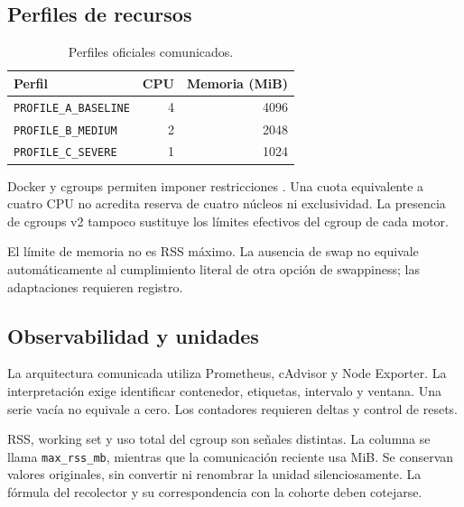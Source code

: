 \subsection{Perfiles de recursos}
\begin{table}[!htbp]\centering
\caption{Perfiles oficiales comunicados.}\label{tab:perfiles}
\begin{tabular}{lrr}\toprule
Perfil & CPU & Memoria (MiB)\\\midrule
\texttt{PROFILE\_A\_BASELINE} & 4 & 4096\\
\texttt{PROFILE\_B\_MEDIUM} & 2 & 2048\\
\texttt{PROFILE\_C\_SEVERE} & 1 & 1024\\
\bottomrule\end{tabular}
\end{table}
Docker y cgroups permiten imponer restricciones \cite{docker,kernel}.
Una cuota equivalente a cuatro CPU no acredita reserva de cuatro
núcleos ni exclusividad. La presencia de cgroups v2 tampoco sustituye
los límites efectivos del cgroup de cada motor.

El límite de memoria no es RSS máximo. La ausencia de swap no equivale
automáticamente al cumplimiento literal de otra opción de swappiness;
las adaptaciones requieren registro.

\subsection{Observabilidad y unidades}
La arquitectura comunicada utiliza Prometheus, cAdvisor y Node Exporter.
La interpretación exige identificar contenedor, etiquetas, intervalo y
ventana. Una serie vacía no equivale a cero. Los contadores requieren
deltas y control de resets.

RSS, working set y uso total del cgroup son señales distintas.
La columna se llama \texttt{max\_rss\_mb}, mientras que la comunicación
reciente usa MiB. Se conservan valores originales, sin convertir ni
renombrar la unidad silenciosamente. La fórmula del recolector y su
correspondencia con la cohorte deben cotejarse.
